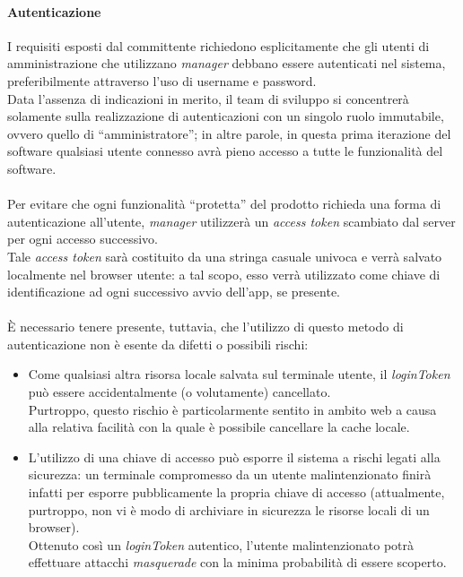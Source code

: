 \documentclass[12pt]{article}
\begin{document}
\paragraph{Autenticazione}
I requisiti esposti dal committente richiedono esplicitamente che gli utenti di amministrazione che utilizzano \textit{manager} debbano essere autenticati nel sistema, preferibilmente attraverso l'uso di username e password.\\
Data l'assenza di indicazioni in merito, il team di sviluppo si concentrerà solamente sulla realizzazione di autenticazioni con un singolo ruolo immutabile, ovvero quello di ``amministratore''; in altre parole, in questa prima iterazione del software qualsiasi utente connesso avrà pieno accesso a tutte le funzionalità del software.\\\\
Per evitare che ogni funzionalità ``protetta'' del prodotto richieda una forma di autenticazione all'utente, \textit{manager} utilizzerà un \textit{access token} scambiato dal server per ogni accesso successivo.\\
Tale \textit{access token} sarà costituito da una stringa casuale univoca e verrà salvato localmente nel browser utente: a tal scopo, esso verrà utilizzato come chiave di identificazione ad ogni successivo avvio dell'app, se presente.\\\\
È necessario tenere presente, tuttavia, che l'utilizzo di questo metodo di autenticazione non è esente da difetti o possibili rischi:
\begin{itemize}
\item Come qualsiasi altra risorsa locale salvata sul terminale utente, il \textit{loginToken} può essere accidentalmente (o volutamente) cancellato.\\ Purtroppo, questo rischio è particolarmente sentito in ambito web a causa alla relativa facilità con la quale è possibile cancellare la cache locale.
\item L'utilizzo di una chiave di accesso può esporre il sistema a rischi legati alla sicurezza: un terminale compromesso da un utente malintenzionato finirà infatti per esporre pubblicamente la propria chiave di accesso (attualmente, purtroppo, non vi è modo di archiviare in sicurezza le risorse locali di un browser).\\
Ottenuto così un \textit{loginToken} autentico, l'utente malintenzionato potrà effettuare attacchi \textit{masquerade} con la minima probabilità di essere scoperto.
\end{itemize}
\end{document}

